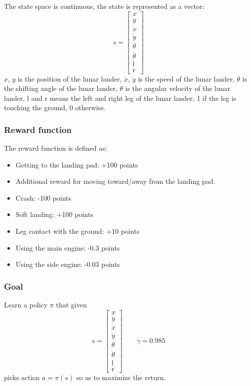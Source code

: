 The state space is continuous, the state is represented as a vector:
\begin{equation*}
    s = \begin{bmatrix}
        x\\
        y\\
        \dot{x}\\
        \dot{y}\\
        \theta\\
        \dot{\theta}\\
        \text{l}\\
        \text{r}
    \end{bmatrix}
\end{equation*}
$x$, $y$ is the position of the lunar lander, $\dot{x}$, $\dot{y}$ is the speed of the lunar lander,
$\theta$ is the shifting angle of the lunar lander, $\dot{\theta}$ is the angular velocity of the lunar lander,
$\text{l}$ and $\text{r}$ means the left and right leg of the lunar lander, 
1 if the leg is touching the ground, 0 otherwise.

\subsubsection*{Reward function}
The reward function is defined as:
\begin{itemize}
    \item Getting to the landing pad: +100 points
    \item Additional reward for moving toward/away from the landing pad.
    \item Crash: -100 points
    \item Soft landing: +100 points
    \item Leg contact with the ground: +10 points
    \item Using the main engine: -0.3 points
    \item Using the side engine: -0.03 points
\end{itemize}

\subsubsection*{Goal}
Learn a policy $\pi$ that given
\begin{equation*}
    s = \begin{bmatrix}
        x\\
        y\\
        \dot{x}\\
        \dot{y}\\
        \theta\\
        \dot{\theta}\\
        \text{l}\\
        \text{r}
    \end{bmatrix}
    \qquad \gamma = 0.985
\end{equation*}
picks action $a = \pi(s)$ so as to maximize the return.

